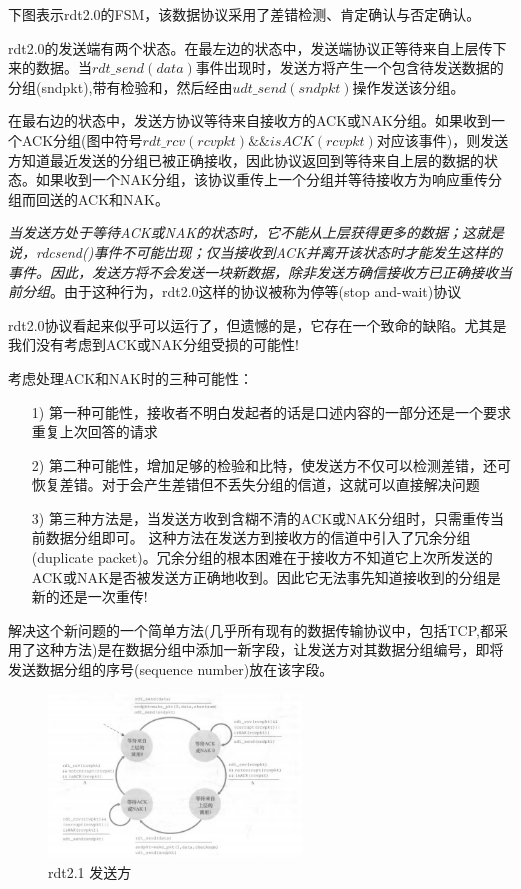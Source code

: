     下图表示rdt2.0的FSM，该数据协议采用了差错检测、肯定确认与否定确认。

    rdt2.0的发送端有两个状态。在最左边的状态中，发送端协议正等待来自上层传下来的数据。当$rdt\_send(data)$事件岀现时，发送方将产生一个包含待发送数据的分组(sndpkt),带有检验和，然后经由$udt\_send(sndpkt)$操作发送该分组。

    在最右边的状态中，发送方协议等待来自接收方的ACK或NAK分组。如果收到一个ACK分组(图中符号$rdt\_rcv(rcvpkt) \&\& isACK(rcvpkt)$对应该事件)，则发送方知道最近发送的分组已被正确接收，因此协议返回到等待来自上层的数据的状态。如果收到一个NAK分组，该协议重传上一个分组并等待接收方为响应重传分组而回送的ACK和NAK。

    \emph{当发送方处于等待ACK或NAK的状态时，它不能从上层获得更多的数据；这就是说，rdcsend()事件不可能岀现；仅当接收到ACK并离开该状态时才能发生这样的事件。因此，发送方将不会发送一块新数据，除非发送方确信接收方已正确接收当前分组}。由于这种行为，rdt2.0这样的协议被称为停等(stop and-wait)协议

    rdt2.0协议看起来似乎可以运行了，但遗憾的是，它存在一个致命的缺陷。尤其是我们没有考虑到ACK或NAK分组受损的可能性!

    考虑处理ACK和NAK时的三种可能性：

\begin{itemize}
    \item [1)] 第一种可能性，接收者不明白发起者的话是口述内容的一部分还是一个要求重复上次回答的请求
    \item [2)] 第二种可能性，增加足够的检验和比特，使发送方不仅可以检测差错，还可恢复差错。对于会产生差错但不丢失分组的信道，这就可以直接解决问题
    \item [3)] 第三种方法是，当发送方收到含糊不清的ACK或NAK分组时，只需重传当前数据分组即可。
    \subitem 这种方法在发送方到接收方的信道中引入了冗余分组(duplicate packet)。冗余分组的根本困难在于接收方不知道它上次所发送的ACK或NAK是否被发送方正确地收到。因此它无法事先知道接收到的分组是新的还是一次重传!
\end{itemize}

    解决这个新问题的一个简单方法(几乎所有现有的数据传输协议中，包括TCP,都采用了这种方法)是在数据分组中添加一新字段，让发送方对其数据分组编号，即将发送数据分组的序号(sequence number)放在该字段。

\begin{figure}[!htbp]
    \centering
    \includegraphics[width=0.6\textwidth]{image/chapter03/rdt2.1发送方.png}
    \caption{rdt2.1 发送方}
\end{figure}

